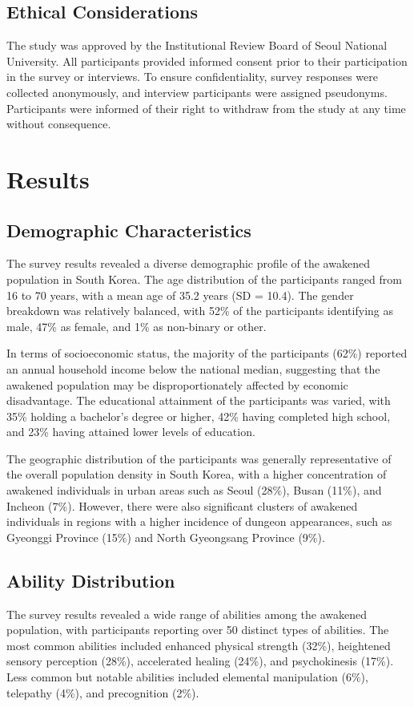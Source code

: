 \documentclass[12pt, a4paper]{article}
\begin{document}
\subsection{Ethical Considerations}
The study was approved by the Institutional Review Board of Seoul National University. All participants provided informed consent prior to their participation in the survey or interviews. To ensure confidentiality, survey responses were collected anonymously, and interview participants were assigned pseudonyms. Participants were informed of their right to withdraw from the study at any time without consequence.

\section{Results}
\subsection{Demographic Characteristics}
The survey results revealed a diverse demographic profile of the awakened population in South Korea. The age distribution of the participants ranged from 16 to 70 years, with a mean age of 35.2 years (SD = 10.4). The gender breakdown was relatively balanced, with 52\% of the participants identifying as male, 47\% as female, and 1\% as non-binary or other.

In terms of socioeconomic status, the majority of the participants (62\%) reported an annual household income below the national median, suggesting that the awakened population may be disproportionately affected by economic disadvantage. The educational attainment of the participants was varied, with 35\% holding a bachelor's degree or higher, 42\% having completed high school, and 23\% having attained lower levels of education.

The geographic distribution of the participants was generally representative of the overall population density in South Korea, with a higher concentration of awakened individuals in urban areas such as Seoul (28\%), Busan (11\%), and Incheon (7\%). However, there were also significant clusters of awakened individuals in regions with a higher incidence of dungeon appearances, such as Gyeonggi Province (15\%) and North Gyeongsang Province (9\%).

\subsection{Ability Distribution}
The survey results revealed a wide range of abilities among the awakened population, with participants reporting over 50 distinct types of abilities. The most common abilities included enhanced physical strength (32\%), heightened sensory perception (28\%), accelerated healing (24\%), and psychokinesis (17\%). Less common but notable abilities included elemental manipulation (6\%), telepathy (4\%), and precognition (2\%).
\end{document}
